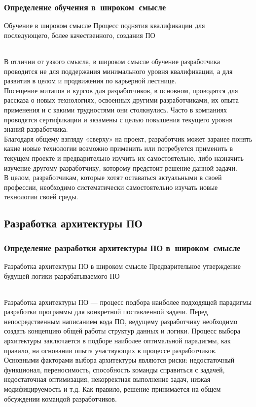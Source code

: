 \documentclass[lecturenotes]{../industrial-development}
\begin{document}
\begin{frame} \frametitle{Определение обучения в~широком~смысле}
	\begin{block}{Обучение в широком смысле}
		 Процесс поднятия квалификации для последующего, более качественного, создания ПО
	\end{block}{}
\end{frame}
\lecturenotes
\\В отличии от узкого смысла, в широком смысле обучение разработчика проводится не для поддержания минимального уровня квалификации, а для развития в целом и продвижения по карьерной лестнице.\\
Посещение митапов и курсов для разработчиков, в основном, проводятся для рассказа о новых технологиях, освоенных другими разработчиками, их опыта применения и с какими трудностями они столкнулись. Часто в компаниях проводятся сертификации и экзамены с целью повышения текущего уровня знаний разработчика.\\
Благодаря общему взгляду «сверху» на проект, разработчик может заранее понять какие новые технологии возможно применить или потребуется применить в текущем проекте и предварительно изучить их самостоятельно, либо назначить изучение другому разработчику, которому предстоит решение данной задачи.\\
В целом, разработчикам, которые хотят оставаться актуальными в своей профессии, необходимо систематически самостоятельно изучать новые технологии своей среды.


\subsection{Разработка архитектуры ПО}
\begin{frame} \frametitle{Определение разработки архитектуры ПО в~широком~смысле}
  \begin{block}{Разработка архитектуры ПО в широком смысле}
  	Предварительное утверждение будущей логики разрабатываемого ПО
  \end{block}{}	
\end{frame}
\lecturenotes
\\Разработка архитектуры ПО --- процесс подбора наиболее подходящей парадигмы разработки программы для конкретной поставленной задачи. Перед непосредственным написанием кода ПО, ведущему разработчику необходимо создать концепцию общей работы структур данных и логики. Процесс выбора архитектуры заключается в подборе наиболее оптимальной парадигмы, как правило, на основании опыта участвующих в процессе разработчиков.
Основными факторами выбора архитектуры являются риски: недостаточный функционал, переносимость, способность команды справиться с задачей, недостаточная оптимизация, некорректная выполнение задач, низкая модифицируемость и т.д. Как правило, решение принимается на общем обсуждении командой разработчиков.
\end{document}
